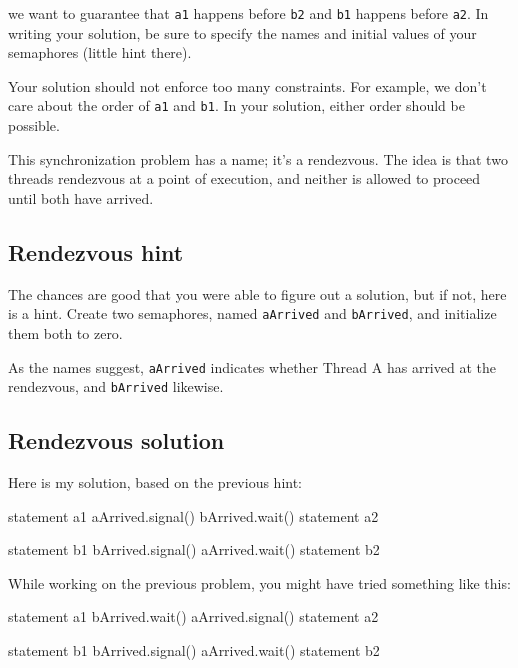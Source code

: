 \documentclass{book}
\begin{document}
we want to guarantee that {\tt a1} happens before {\tt b2} and
    {\tt b1} happens before {\tt a2}.  In writing your solution, be sure
to specify the names and initial values of your semaphores
(little hint there).

Your solution should not enforce too many constraints.  For example,
we don't care about the order of {\tt a1} and {\tt b1}.  In your
solution, either order should be possible.

This synchronization problem has a name; it's a
rendezvous.  The idea is that two threads rendezvous
at a point of execution, and neither is allowed to proceed
until both have arrived.



\subsection{Rendezvous hint}

The chances are good that you were able to figure out a solution,
but if not, here is a hint.  Create two semaphores, named {\tt aArrived}
and {\tt bArrived}, and initialize them both to zero.

As the names suggest, {\tt aArrived} indicates whether Thread A
has arrived at the rendezvous, and {\tt bArrived} likewise.


\subsection{Rendezvous solution}

Here is my solution, based on the previous hint:

\begin{minipage}[t]{0.4\textwidth}
    \begin{unbreakable}[title={Thread A}]{}
statement a1
aArrived.signal()
bArrived.wait()
statement a2
\end{unbreakable}
\end{minipage}
\hfill
\begin{minipage}[t]{0.4\textwidth}
    \begin{unbreakable}[title={Thread B}]{}
statement b1
bArrived.signal()
aArrived.wait()
statement b2
\end{unbreakable}
\end{minipage}

While working on the previous problem, you might have
tried something like this:

\begin{minipage}[t]{0.4\textwidth}
    \begin{unbreakable}[title={Thread A}]{}
statement a1
bArrived.wait()
aArrived.signal()
statement a2
\end{unbreakable}
\end{minipage}
\hfill
\begin{minipage}[t]{0.4\textwidth}
    \begin{unbreakable}[title={Thread B}]{}
statement b1
bArrived.signal()
aArrived.wait()
statement b2
\end{unbreakable}
\end{minipage}
\end{document}
